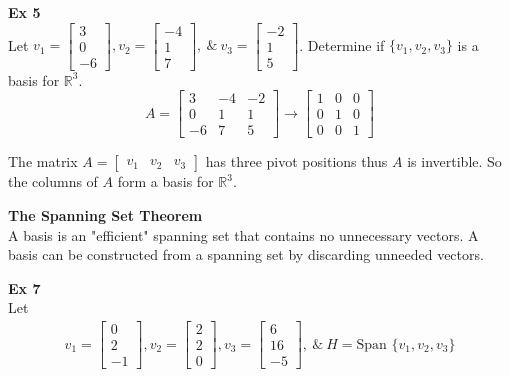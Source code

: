 \documentclass{article}
\begin{document}
  \textbf{Ex 5}\\
  Let $ v_1 = \begin{bmatrix}
    3\\
    0\\
    -6
  \end{bmatrix}, v_2 = \begin{bmatrix}
    -4\\
    1\\
    7
  \end{bmatrix}, ~\&~ v_3 = \begin{bmatrix}
    -2\\
    1\\
    5
  \end{bmatrix} $. Determine if $ \{ v_1,v_2,v_3 \} $ is a basis for $ \mathbb{R}^{3} $.
  \[
    A = \begin{bmatrix}
      3 &-4 &-2\\
      0 &1 &1\\
      -6 &7 &5
    \end{bmatrix} \to 
    \begin{bmatrix}
      1 &0 &0\\
      0 &1 &0\\
      0 &0 &1
    \end{bmatrix}
  \]

  The matrix $ A=\begin{bmatrix}
    v_1 &v_2 &v_3
  \end{bmatrix} $ has three pivot positions thus $ A $ is invertible. So the columns of $ A $ form a basis for $ \mathbb{R}^{3} $.

  \textbf{The Spanning Set Theorem}\\
  A basis is an "efficient" spanning set that contains no unnecessary vectors. A basis can be constructed from a spanning set by discarding unneeded vectors.

  \textbf{Ex 7}\\
  Let
  \[
    \begin{gathered}
    v_1 = \begin{bmatrix}
      0\\
      2\\
      -1
    \end{bmatrix}, v_2 =
    \begin{bmatrix}
      2\\
      2\\
      0
    \end{bmatrix}, v_3=
    \begin{bmatrix}
      6\\
      16\\
      -5
    \end{bmatrix}, ~\&~ 
    H = \text{Span }\{ v_1,v_2,v_3 \}
    \end{gathered}
  \]
\end{document}
